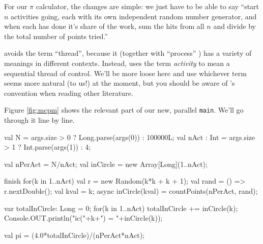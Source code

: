 For our $\pi$ calculator, the changes are simple: we just have to be able to
say ``start $n$ activities going, each with its own independent random number
generator, and when each has done it's share of the work, sum the hits from all
$n$ and divide by the total number of points tried.''  

\Xten{} avoids the term ``thread'', because it (together with ``process'' ) has
a variety of meanings in different contexts.  Instead, \Xten{} uses the term 
{\em activity} to mean a sequential thread of control. We'll be more loose here
and use whichever term seems more natural (to us!) at the moment, but you
should be aware of \Xten's convention when reading other literature.

Figure \ref{fig:mcpm} shows the relevant part of our new, parallel {\tt main}.
We'll go through it line by line.

\begin{xtennum}[frame=tb, caption={Shared-memory parallel code for computing $\pi$},label={fig:mcpm},float=tb]
val N = args.size > 0 ? Long.parse(args(0)) : 100000L;  
val nAct : Int = args.size > 1 ? Int.parse(args(1)) :  4; 

val nPerAct = N/nAct; 
val inCircle = new Array[Long](1..nAct);   

finish for(k in 1..nAct) { 
   val r = new Random(k*k + k + 1);       
   val rand = () => r.nextDouble();       
   val kval = k;                     
   async inCircle(kval) = countPoints(nPerAct, rand); 
}                                 

var totalInCircle: Long = 0;             
for(k in 1..nAct) {      
   totalInCircle += inCircle(k);         
   Console.OUT.println("ic("+k+") = "+inCircle(k)); 
}                                 

val pi = (4.0*totalInCircle)/(nPerAct*nAct); 
\end{xtennum}


